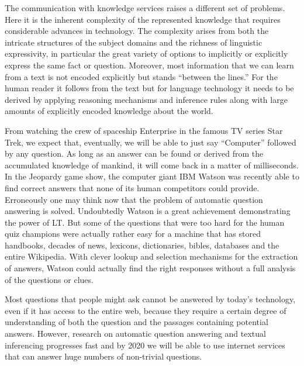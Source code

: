 \documentclass[10pt, plain]{../../metanetpaper}
\begin{document}
\begin{multicols}{2}
The communication with knowledge services raises a different set of problems. Here it is the inherent complexity of the represented knowledge that requires considerable advances in technology. The complexity arises from both the intricate structures of the subject domains and the richness of linguistic expressivity, in particular the great variety of options to implicitly or explicitly express the same fact or question. Moreover, most information that we can learn from a text is not encoded explicitly but stands “between the lines.” For the human reader it follows from the text but for language technology it needs to be derived by applying reasoning mechanisms and inference rules along with large amounts of explicitly encoded knowledge about the world. 
 
 
From watching the crew of spaceship Enterprise in the famous TV series Star Trek, we expect that, eventually, we will be able to just say “Computer” followed by any question. As long as an answer can be found or derived from the accumulated knowledge of mankind, it will come back in a matter of milliseconds. In the Jeopardy game show, the computer giant IBM Watson was recently able to find correct answers that none of its human competitors could provide. Erroneously one may think now that the problem of automatic question answering is solved. Undoubtedly Watson is a great achievement demonstrating the power of LT. But some of the questions that were too hard for the human quiz champions were actually rather easy for a machine that has stored handbooks, decades of news, lexicons, dictionaries, bibles, databases and the entire Wikipedia. With clever lookup and selection mechanisms for the extraction of answers, Watson could actually find the right responses without a full analysis of the questions or clues.
 
Most questions that people might ask cannot be answered by today’s technology, even if it has access to the entire web, because they require a certain degree of understanding of both the question and the passages containing potential answers. However, research on automatic question answering and textual inferencing progresses fast and by 2020 we will be able to use internet services that can answer huge numbers of non-trivial questions.
 

\end{multicols}
\end{document}

